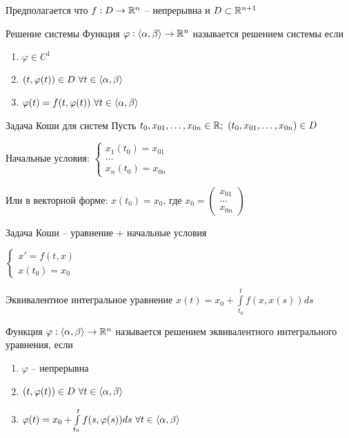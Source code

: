 \documentclass[12pt]{article}
\begin{document}
\begin{Remark}{}
    Предполагается что $f : D \to \mathbb R^n$ -- непрерывна и $D \subset \mathbb R^{n + 1}$
\end{Remark}

\begin{defin}{Решение системы}
    Функция $\varphi : \langle \alpha, \beta \rangle \to \mathbb R^n$ называется решением системы если 

    \begin{enumerate}
        \item $\varphi \in C^1$
        \item $(t, \varphi(t)) \in D\ \forall t \in \langle \alpha, \beta \rangle$
        \item $\varphi(t) = f(t, \varphi(t))\ \forall t \in \langle \alpha, \beta \rangle$
    \end{enumerate}
\end{defin}

\begin{defin}{Задача Коши для систем}
    Пусть $t_0, x_{01}, \ldots, x_{0n} \in \mathbb R;\ (t_0, x_{01}, \ldots, x_{0n}) \in D$

    Начальные условия: $\begin{cases}
        x_1(t_0) = x_{01} \\
        \ldots \\
        x_n(t_0) = x_{0n}
    \end{cases}$

    Или в векторной форме: $x(t_0) = x_0$, где $x_0 = \begin{pmatrix}
        x_{01} \\
        \ldots \\
        x_{0n}
    \end{pmatrix}$

    Задача Коши -- уравнение + начальные условия

    $\begin{cases}
        x' = f(t, x) \\
        x(t_0) = x_0
    \end{cases}$
\end{defin}

\begin{defin}{Эквивалентное интегральное уравнение}
    $x(t) = x_0 + \int\limits_{t_0}^t f(x, x(s))ds$

    Функция $\varphi : \langle \alpha, \beta \rangle \to \mathbb R^n$ называется решением эквивалентного интегрального уравнения, если

    \begin{enumerate}
        \item $\varphi$ -- непрерывна
        \item $(t, \varphi(t)) \in D\ \forall t \in \langle \alpha, \beta \rangle$
        \item $\varphi(t) = x_0 + \int\limits_{t_0}^t f(s, \varphi(s))ds\ \forall t \in \langle \alpha, \beta \rangle$
    \end{enumerate}
\end{defin}
\end{document}
